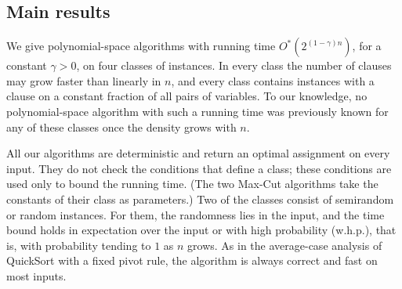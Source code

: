\documentclass[11pt,a4paper]{article}
\theoremstyle{definition}
\theoremstyle{remark}
\newcommand{\Ostar}{O^{*}}
\begin{document}
%

\subsection{Main results}\label{sec:results}

We give polynomial-space algorithms with running time
$\Ostar(2^{(1-\gamma)n})$, for a constant $\gamma>0$, on four classes of
instances. In every class the number of clauses may grow faster than
linearly in $n$, and every class contains instances with a clause on a
constant fraction of all pairs of variables. To our knowledge, no
polynomial-space algorithm with such a running time was previously known
for any of these classes once the density grows with $n$.

All our algorithms are deterministic and return an optimal assignment on
every input. They do not check the conditions that define a class; these
conditions are used only to bound the running time. (The two Max-Cut
algorithms take the constants of their class as parameters.) Two of the
classes consist of semirandom or random instances. For them, the
randomness lies in the input, and the time bound holds in expectation over
the input or with high probability (w.h.p.), that is, with probability
tending to $1$ as $n$ grows. As in the average-case analysis of QuickSort
with a fixed pivot rule, the algorithm is always correct and fast on most
inputs.
\end{document}
